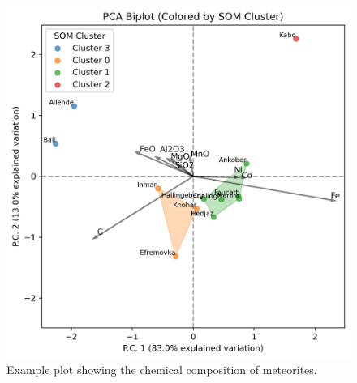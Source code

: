 
\begin{figure}[htbp]
    \centering
    \includegraphics[width=1.0\textwidth]{handin/figures/pca_biplot_som_convexhull.png}
    \caption{Example plot showing the chemical composition of meteorites.}
    \label{fig:pcabiplot_som_convexhull}
\end{figure}